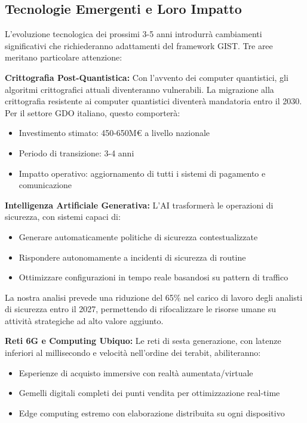 \subsection{\texorpdfstring{\textbf{Tecnologie Emergenti e Loro Impatto}}{5.5.1 - Tecnologie Emergenti e Loro Impatto}}
\label{subsec:5.5.1}

L'evoluzione tecnologica dei prossimi 3-5 anni introdurrà cambiamenti significativi che richiederanno adattamenti del framework GIST. Tre aree meritano particolare attenzione:

\textbf{Crittografia Post-Quantistica:} Con l'avvento dei computer quantistici, gli algoritmi crittografici attuali diventeranno vulnerabili. La migrazione alla crittografia resistente ai computer quantistici diventerà mandatoria entro il 2030. Per il settore GDO italiano, questo comporterà:
\begin{itemize}
\item Investimento stimato: 450-650M€ a livello nazionale
\item Periodo di transizione: 3-4 anni
\item Impatto operativo: aggiornamento di tutti i sistemi di pagamento e comunicazione
\end{itemize}

\textbf{Intelligenza Artificiale Generativa:} L'AI trasformerà le operazioni di sicurezza, con sistemi capaci di:
\begin{itemize}
\item Generare automaticamente politiche di sicurezza contestualizzate
\item Rispondere autonomamente a incidenti di sicurezza di routine
\item Ottimizzare configurazioni in tempo reale basandosi su pattern di traffico
\end{itemize}

La nostra analisi prevede una riduzione del 65\% nel carico di lavoro degli analisti di sicurezza entro il 2027, permettendo di rifocalizzare le risorse umane su attività strategiche ad alto valore aggiunto.

\textbf{Reti 6G e Computing Ubiquo:} Le reti di sesta generazione, con latenze inferiori al millisecondo e velocità nell'ordine dei terabit, abiliteranno:
\begin{itemize}
\item Esperienze di acquisto immersive con realtà aumentata/virtuale
\item Gemelli digitali completi dei punti vendita per ottimizzazione real-time
\item Edge computing estremo con elaborazione distribuita su ogni dispositivo
\end{itemize}

